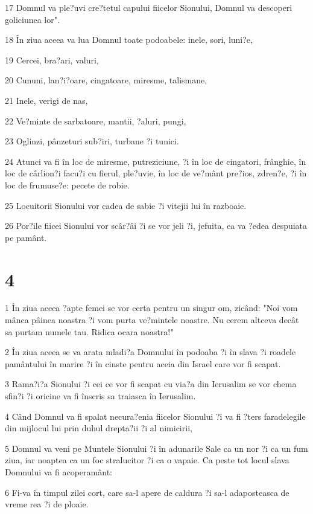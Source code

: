 \par 17 Domnul va ple?uvi cre?tetul capului fiicelor Sionului, Domnul va descoperi goliciunea lor".
\par 18 În ziua aceea va lua Domnul toate podoabele: inele, sori, luni?e,
\par 19 Cercei, bra?ari, valuri,
\par 20 Cununi, lan?i?oare, cingatoare, miresme, talismane,
\par 21 Inele, verigi de nas,
\par 22 Ve?minte de sarbatoare, mantii, ?aluri, pungi,
\par 23 Oglinzi, pânzeturi sub?iri, turbane ?i tunici.
\par 24 Atunci va fi în loc de miresme, putreziciune, ?i în loc de cingatori, frânghie, în loc de cârlion?i facu?i cu fierul, ple?uvie, în loc de ve?mânt pre?ios, zdren?e, ?i în loc de frumuse?e: pecete de robie.
\par 25 Locuitorii Sionului vor cadea de sabie ?i vitejii lui în razboaie.
\par 26 Por?ile fiicei Sionului vor scâr?âi ?i se vor jeli ?i, jefuita, ea va ?edea despuiata pe pamânt.

\chapter{4}

\par 1 În ziua aceea ?apte femei se vor certa pentru un singur om, zicând: "Noi vom mânca pâinea noastra ?i vom purta ve?mintele noastre. Nu cerem altceva decât sa purtam numele tau. Ridica ocara noastra!"
\par 2 În ziua aceea se va arata mladi?a Domnului în podoaba ?i în slava ?i roadele pamântului în marire ?i în cinste pentru aceia din Israel care vor fi scapat.
\par 3 Rama?i?a Sionului ?i cei ce vor fi scapat cu via?a din Ierusalim se vor chema sfin?i ?i oricine va fi înscris sa traiasca în Ierusalim.
\par 4 Când Domnul va fi spalat necura?enia fiicelor Sionului ?i va fi ?ters faradelegile din mijlocul lui prin duhul drepta?ii ?i al nimicirii,
\par 5 Domnul va veni pe Muntele Sionului ?i în adunarile Sale ca un nor ?i ca un fum ziua, iar noaptea ca un foc stralucitor ?i ca o vapaie. Ca peste tot locul slava Domnului va fi acoperamânt:
\par 6 Fi-va în timpul zilei cort, care sa-l apere de caldura ?i sa-l adaposteasca de vreme rea ?i de ploaie.

